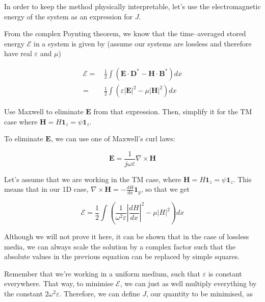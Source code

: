 \pagebreak


In order to keep the method physically interpretable, let's use the electromagnetic energy of the system as an expression for $J$.

From the complex Poynting theorem, we know that the time--averaged stored energy $\mathcal{E}$ in a system is given by (assume our systems are lossless and therefore have real $\varepsilon$ and $\mu$)

\begin{align}
\mathcal{E} =& \, \frac{1}{2} \int \left( {\mathbf E} \cdot {\mathbf D}^* - {\mathbf H} \cdot {\mathbf B}^* \right ) dx \\
  =& \, \frac{1}{2} \int \left( \varepsilon |{\mathbf E}|^2 - \mu |{\mathbf H}|^2 \right) dx
\end{align} 

\begin{cue}
Use Maxwell to eliminate ${\mathbf E}$ from that expression. Then, simplify it for the TM case where ${\mathbf H} = H {\mathbf 1}_z = \psi {\mathbf 1}_z $.  
\end{cue}

To eliminate ${\mathbf E}$, we can use one of Maxwell's curl laws:

\begin{equation}
{\mathbf E} = \frac{1}{j \omega \varepsilon} \nabla \times {\mathbf H}
\end{equation}  

Let's assume that we are working in the TM case, where ${\mathbf H} = H {\mathbf 1}_z = \psi {\mathbf 1}_z $. This means that in our 1D case, $\nabla \times {\mathbf H}=-{\frac{d H}{d x}}{\mathbf 1}_y $, so that we get

\begin{equation}
\mathcal{E} = \frac{1}{2} \int \left( \frac{1}{\omega ^2 \varepsilon}\left|{\frac{d H}{d x}}\right|^2 - \mu |H|^2 \right) dx
\end{equation}

Although we will not prove it here, it can be shown that in the case of lossless media, we can always scale the solution by a complex factor such that the absolute values in the previous equation can be replaced by simple squares.

Remember that we're working in a uniform medium, such that $\varepsilon$ is constant everywhere. That way, to minimise $\mathcal{E}$, we can just as well multiply everything by the constant $2 \omega ^2 \varepsilon$. Therefore, we can define $J$, our quantity to be minimised, as

